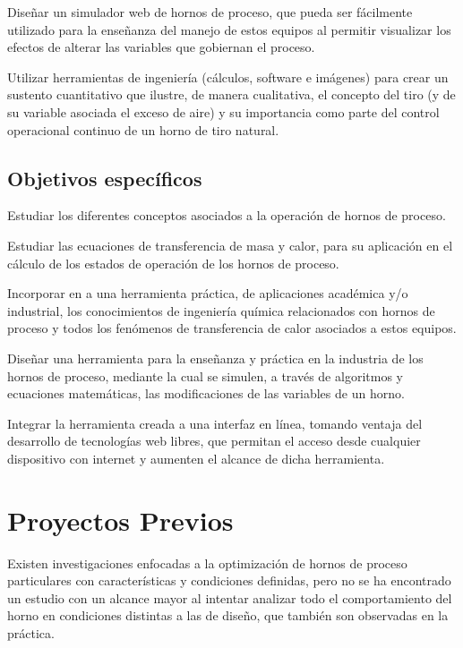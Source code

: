 \par Diseñar un simulador web de hornos de proceso, que pueda ser fácilmente utilizado para la enseñanza del manejo de estos equipos al permitir visualizar los efectos de alterar las variables que gobiernan el proceso.

Utilizar herramientas de ingeniería (cálculos, software e imágenes) para crear un sustento cuantitativo que ilustre, de manera cualitativa, el concepto del tiro (y de su variable asociada el exceso de aire) y su importancia como parte del control operacional continuo de un horno de tiro natural.

\subsection{Objetivos específicos}

\par Estudiar los diferentes conceptos asociados a la operación de hornos de proceso.

\par Estudiar las ecuaciones de transferencia de masa y calor, para su aplicación en el cálculo de los estados de operación de los hornos de proceso.

\par Incorporar en a una herramienta práctica, de aplicaciones académica y/o industrial, los conocimientos de ingeniería química relacionados con hornos de proceso y todos los fenómenos de transferencia de calor asociados a estos equipos.

\par Diseñar una herramienta para la enseñanza y práctica en la industria de los hornos de proceso, mediante la cual se simulen, a través de algoritmos y ecuaciones matemáticas, las modificaciones de las variables de un horno.

\par Integrar la herramienta creada a una interfaz en línea, tomando ventaja del desarrollo de tecnologías web libres, que permitan el acceso desde cualquier dispositivo con internet y aumenten el alcance de dicha herramienta.

\section{Proyectos Previos}

\par Existen investigaciones enfocadas a la optimización de hornos de proceso particulares\cite{bib:leti} con características y condiciones definidas, pero no se ha encontrado un estudio con un alcance mayor al intentar analizar todo el comportamiento del horno en condiciones distintas a las de diseño, que también son observadas en la práctica.

